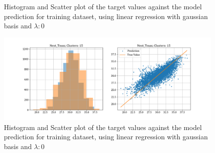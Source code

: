 \documentclass[12pt,a4paper]{article}
\begin{document}
\begin{itemize}
\begin{figure}[H]
        \caption{Histogram and Scatter plot of the target values against the model prediction for training dataset, using linear regression with gaussian basis and $\lambda: 0$}
    \end{figure}
    \begin{figure}[H]
        \centering
        \includegraphics[scale=0.4]{images/t3_d3/no_reg/T_max_nclu_15.png}
        \caption{Histogram and Scatter plot of the target values against the model prediction for training dataset, using linear regression with gaussian basis and $\lambda: 0$}
    \end{figure}


\end{itemize}
\end{document}
